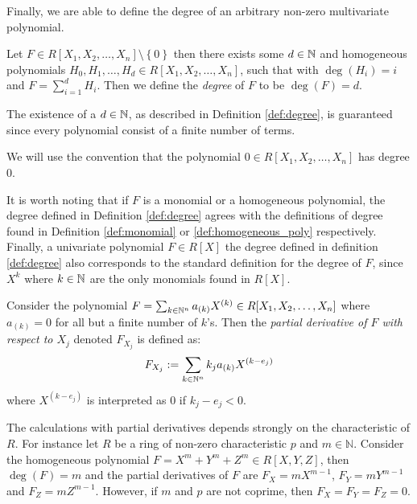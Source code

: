 Finally, we are able to define the degree of an arbitrary non-zero multivariate polynomial.

\begin{definition}\label{def:degree}
  Let $F \in R[X_1, X_2, \ldots, X_{n}] \setminus \left\{0\right\}$ then there exists some $d \in \mathbb{N}$ and homogeneous polynomials $H_{0}, H_{1}, \ldots, H_{d} \in R[X_1, X_2, \ldots, X_{n}]$, such that with $\deg(H_{i}) = i$ and $F = \sum^{d}_{i = 1} H_{i}$.
 Then we define the \textit{degree} of $F$ to be $\deg(F) = d$.
\end{definition}
The existence of a $d \in \mathbb{N}$, as described in Definition \ref{def:degree}, is guaranteed since every polynomial consist of a finite number of terms.
\begin{remark}\label{rem:deg_0}
  We will use the convention that the polynomial $0 \in R[X_1, X_2, \ldots, X_{n}]$ has degree $0$.
\end{remark}
It is worth noting that if $F$ is a monomial or a homogeneous polynomial, the degree defined in Definition \ref{def:degree} agrees with the definitions of degree found in Definition \ref{def:monomial} or \ref{def:homogeneous_poly} respectively.
Finally, a univariate polynomial $F \in R[X]$ the degree defined in definition \ref{def:degree} also corresponds to the standard definition for the degree of $F$, since $X^{k}$ where $k \in \mathbb{N}$ are the only monomials found in $R[X]$.

Consider the polynomial $F = \sum_{k \in \mathbb{N}^{n}} a_{(k)}X^{(k)} \in R[X_1, X_2, \ldots, X_{n}]$ where $a_{(k)} = 0$ for all but a finite number of $k$'s. Then the \textit{partial derivative of $F$ with respect to $X_{j}$} denoted $F_{X_j}$ is defined as:
\begin{equation*}
F_{X_{j}} := \sum_{k \in \mathbb{N}^{n}} k_{j} a_{(k)} X^{(k - e_{j})}
\end{equation*}
where $X^{(k - e_{j})}$ is interpreted as $0$ if $k_{j} - e_{j} < 0$.

\begin{example}\label{exmp:fermat_curve_derivatives}
   The calculations with partial derivatives depends strongly on the characteristic of $R$. For instance let $R$ be a ring of non-zero characteristic $p$ and $m \in \mathbb{N}$. Consider the homogeneous polynomial $F = X^{m} + Y^{m} + Z^{m} \in R[X, Y, Z]$, then $\deg(F) = m$ and the partial derivatives of $F$ are $F_{X} = mX^{m-1}$, $F_{Y} = mY^{m-1}$ and $F_{Z} = mZ^{m-1}$. However, if $m$ and $p$ are not coprime, then $F_X = F_Y = F_Z = 0$.
\end{example}

